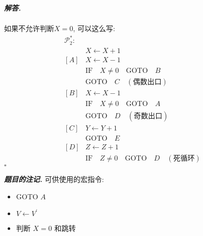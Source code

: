 \documentclass[10pt, a4paper, oneside]{ctexart}
\newenvironment{solution}{%
  \par\noindent\textbf{\textit{解答. }}\ignorespaces
}{%
  \hfill\ensuremath{\square}\par
}
\newenvironment{note}{\par\noindent\textbf{\textit{题目的注记. }}\ignorespaces}{\par}
\begin{document}
\begin{solution}
\begin{align*}
    \end{align*} 
    如果不允许判断$X=0$, 可以这么写:
    \begin{align*}
        \mathscr{P}_2^*:&\\
        &X\leftarrow X+1\\
        [A]&X\leftarrow X-1\\
        &\text{IF}\quad X\neq 0 \quad \text{GOTO}\quad  B\\
        &\text{GOTO} \quad C\quad(\text{偶数出口})\\
        [B]&X\leftarrow X-1\\
        &\text{IF}\quad X\neq 0 \quad \text{GOTO}\quad  A\\
        &\text{GOTO} \quad D\quad(\text{奇数出口})\\
        [C]&Y\leftarrow Y+1\\
        &\text{GOTO}\quad E\\
        [D]&Z\leftarrow Z+1\\
        &\text{IF}\quad Z\neq 0 \quad \text{GOTO}\quad  D\quad(\text{死循环})
    \end{align*} 
\end{solution}

\begin{note}
可供使用的宏指令:\begin{itemize}
    \item GOTO $A$
    \item $V\leftarrow V^{\prime}$ 
    \item 判断 $X=0$ 和跳转
\end{itemize}
\end{note}
\end{document}
